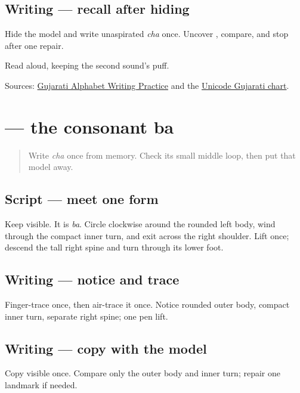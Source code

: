 \subsection*{Writing — recall after hiding}
Hide the model and write unaspirated \emph{cha} once. Uncover \textbf{}, compare, and stop after one repair.

\begin{tcolorbox}[breakable,colback=teal!4,colframe=teal!35!black,title={Before you move on}]
Read \textbf{ } aloud, keeping the second sound's puff.

Sources: \href{https://www.t30apps.com/gujarati-alphabet-writing/}{Gujarati Alphabet Writing Practice} and the \href{https://www.unicode.org/charts/PDF/U0A80.pdf}{Unicode Gujarati chart}.
\end{tcolorbox}
\section[\texorpdfstring{\gu{બ} (ba)}{બ (ba)}]{ — the consonant ba}

\label{lesson:GU-W05-ba}



\begin{quote}
Write \emph{cha} once from memory. Check its small middle loop, then put that model away.
\end{quote}

\subsection*{Script — meet one form}
Keep \textbf{} visible. It is \emph{ba}. Circle clockwise around the rounded left body, wind through the compact inner turn, and exit across the right shoulder. Lift once; descend the tall right spine and turn through its lower foot.

\subsection*{Writing — notice and trace}

Finger-trace \textbf{} once, then air-trace it once. Notice rounded outer body, compact inner turn, separate right spine; one pen lift.

\subsection*{Writing — copy with the model}
Copy visible \textbf{} once. Compare only the outer body and inner turn; repair one landmark if needed.

